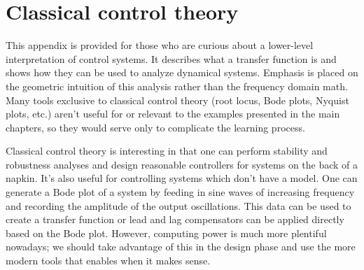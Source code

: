 
\chapter{Classical control theory}

This appendix is provided for those who are curious about a lower-level
interpretation of control systems. It describes what a transfer function is and
shows how they can be used to analyze dynamical systems. Emphasis is placed on
the geometric intuition of this analysis rather than the frequency domain math.
Many tools exclusive to classical control theory (root locus, Bode plots,
Nyquist plots, etc.) aren't useful for or relevant to the examples presented in
the main chapters, so they would serve only to complicate the learning process.

Classical control theory is interesting in that one can perform stability and
robustness analyses and design reasonable controllers for systems on the back of
a napkin. It's also useful for controlling systems which don't have a model. One
can generate a Bode plot of a system by feeding in sine waves of increasing
frequency and recording the amplitude of the output oscillations. This data can
be used to create a transfer function or lead and lag compensators can be
applied directly based on the Bode plot. However, computing power is much more
plentiful nowadays; we should take advantage of this in the design phase and use
the more modern tools that enables when it makes sense.

\renewcommand*{\chapterpath}{\partpath/classical-control-theory}



